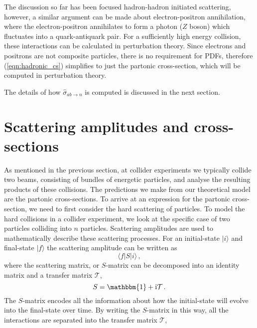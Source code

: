 \documentclass[main.tex]{subfiles}
\begin{document}
    The discussion so far has been focused hadron-hadron
    initiated scattering, however, a similar argument
    can be made about electron-positron annihilation,
    where the electron-positron annihilates to form a
    photon ($Z$ boson) which fluctuates into a quark-antiquark
    pair. For a sufficiently high energy collision,
    these interactions can be calculated in perturbation
    theory.
    Since electrons and positrons are not composite
    particles, there is no requirement for PDFs,
    therefore (\ref{eqn:hadronic_cs}) simplifies
    to just the partonic cross-section, which
    will be computed in perturbation theory.
    
    The details of how $\hat{\sigma}_{ab \rightarrow n}$
    is computed is discussed in the next section.

\section{Scattering amplitudes and cross-sections}\label{sec:xs}
    As mentioned in the previous section, at
    collider experiments we typically collide
    two beams, consisting of bundles of energetic
    particles, and analyse the resulting products
    of these collisions. The predictions we make
    from our theoretical model are the partonic
    cross-sections. To arrive at an expression
    for the partonic cross-section, we need to
    first consider the hard scattering of particles.
    To model the hard collisions in
    a collider experiment, we look at the specific
    case of two particles colliding into $n$ particles.
    Scattering amplitudes are used to mathematically
    describe these scattering processes.
    For an initial-state
    $|i\rangle$ and final-state $|f\rangle$
    the scattering amplitude can be written as
    \begin{equation}\label{eqn:scattering}
        \langle f | S | i \rangle \, ,
    \end{equation}
    where the scattering matrix, or $S$-matrix
    can be decomposed into an identity matrix
    and a transfer matrix $\mathcal{T}$,
    \begin{equation}\label{eqn:S_matrix}
        S = \mathbbm{1} + \mathrm{i}\mathcal{T} \, .
    \end{equation}
    The $S$-matrix encodes all the information
    about how the initial-state will evolve
    into the final-state over time. By writing
    the $S$-matrix in this way, all the interactions
    are separated into the transfer matrix $\mathcal{T}$,
\end{document}
